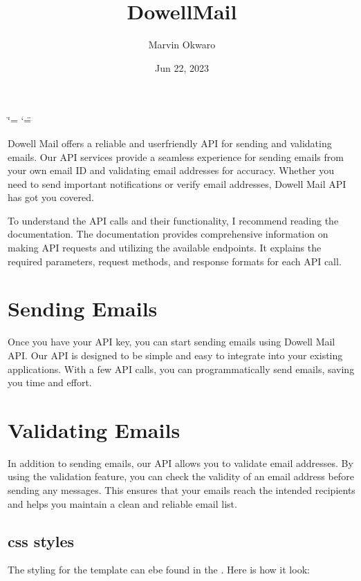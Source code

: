 \documentclass[letterpaper,10pt,english]{sphinxmanual}
\title{Dowell\sphinxhyphen{}Mail}
\date{Jun 22, 2023}
\author{Marvin Okwaro}
\begin{document}
\ifdefined\shorthandoff
  \ifnum\catcode`\=\string=\active\shorthandoff{=}\fi
  \ifnum\catcode`\"=\active{}\fi
\fi

\pagestyle{empty}
\sphinxmaketitle
\pagestyle{plain}
\sphinxtableofcontents
\pagestyle{normal}
\label{\detokenize{index::doc}}


\sphinxAtStartPar
Dowell Mail offers a reliable and user\sphinxhyphen{}friendly API for sending and validating emails. Our API services provide a seamless experience for sending emails from your own email ID and validating email addresses for accuracy. Whether you need to send important notifications or verify email addresses, Dowell Mail API has got you covered.

\sphinxAtStartPar
To understand the API calls and their functionality, I recommend reading the documentation. The documentation provides comprehensive information on making API requests and utilizing the available endpoints. It explains the required parameters, request methods, and response formats for each API call.


\chapter{Sending Emails}
\label{\detokenize{index:sending-emails}}
\sphinxAtStartPar
Once you have your API key, you can start sending emails using Dowell Mail API. Our API is designed to be simple and easy to integrate into your existing applications. With a few API calls, you can programmatically send emails, saving you time and effort.


\chapter{Validating Emails}
\label{\detokenize{index:validating-emails}}
\sphinxAtStartPar
In addition to sending emails, our API allows you to validate email addresses. By using the validation feature, you can check the validity of an email address before sending any messages. This ensures that your emails reach the intended recipients and helps you maintain a clean and reliable email list.

\sphinxstepscope


\section{css styles}
\label{\detokenize{static:css-styles}}\label{\detokenize{static::doc}}
\sphinxAtStartPar
The styling for the  template can ebe found in the .
Here is how it look:
\end{document}
